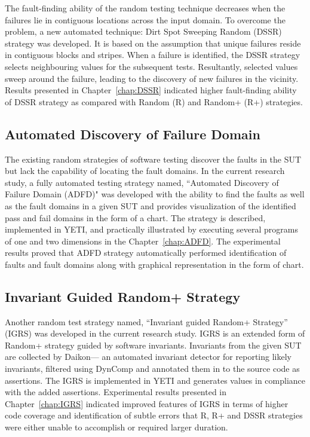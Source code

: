 The fault-finding ability of the random testing technique decreases when the failures lie in contiguous locations across the input domain. To overcome the problem, a new automated technique: Dirt Spot Sweeping Random (DSSR) strategy was developed. It is based on the assumption that unique failures reside in contiguous blocks and stripes. When a failure is identified, the DSSR strategy selects neighbouring values for the subsequent tests. Resultantly, selected values sweep around the failure, leading to the discovery of new failures in the vicinity. Results presented in Chapter~\ref{chap:DSSR} indicated higher fault-finding ability of DSSR strategy as compared with Random (R) and Random+ (R+) strategies.

\subsection{Automated Discovery of Failure Domain}
The existing random strategies of software testing discover the faults in the SUT but lack the capability of locating the fault domains. In the current research study, a fully automated testing strategy named, ``Automated Discovery of Failure Domain (ADFD)" was developed with the ability to find the faults as well as the fault domains in a given SUT and provides visualization of the identified pass and fail domains in the form of a chart. The strategy is described, implemented in YETI, and practically illustrated by executing several programs of one and two dimensions in the Chapter~\ref{chap:ADFD}. The experimental results proved that ADFD strategy automatically performed identification of faults and fault domains along with graphical representation in the form of chart.

\subsection{Invariant Guided Random+ Strategy}
Another random test strategy named, ``Invariant guided Random+ Strategy'' (IGRS) was developed in the current research study. IGRS is an extended form of Random+ strategy guided by software invariants. Invariants from the given SUT are collected by Daikon--- an automated invariant detector for reporting likely invariants, filtered using DynComp and annotated them in to the source code as assertions. The IGRS is implemented in YETI and generates values in compliance with the added assertions. Experimental results presented in Chapter~\ref{chap:IGRS} indicated improved features of IGRS in terms of higher code coverage and identification of subtle errors that R, R+ and DSSR strategies were either unable to accomplish or required larger duration.  

